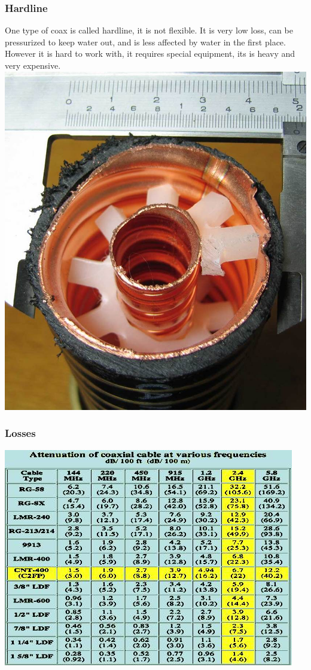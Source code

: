 \documentclass[10pt, handout]{beamer}
\begin{document}
\begin{frame}
\frametitle{Hardline}
One type of coax is called hardline, it is not flexible. It is very low loss, can be pressurized to keep water out, and is less affected by water in the first place.\\
However it is hard to work with, it requires special equipment, its is heavy and very expensive.\\
\includegraphics[height=.4\textheight]{4inhardline.jpg}
\end{frame}

\begin{frame}
\frametitle{Losses}
\includegraphics[height=.9\textheight]{coaxatten.jpg}
\end{frame}
\end{document}
